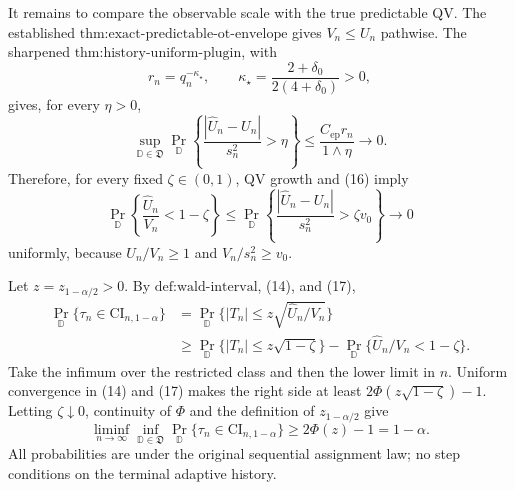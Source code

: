 It remains to compare the observable scale with the true predictable QV. The established \(\text{thm:exact-predictable-ot-envelope}\) gives \(V_n\le U_n\) pathwise. The sharpened \(\text{thm:history-uniform-plugin}\), with
\[
r_n=q_n^{-\kappa_\star},\qquad
\kappa_\star=\frac{2+\delta_0}{2(4+\delta_0)}>0,
\tag{15}
\]
gives, for every \(\eta>0\),
\[
\sup_{\mathbb D\in\mathfrak D}\Pr_{\mathbb D}
\left\{\frac{|\widehat U_n-U_n|}{s_n^2}>\eta\right\}
\le\frac{C_{\mathrm{ep}}r_n}{1\wedge\eta}\longrightarrow0.
\tag{16}
\]
Therefore, for every fixed \(\zeta\in(0,1)\), QV growth and (16) imply
\[
\Pr_{\mathbb D}\left\{\frac{\widehat U_n}{V_n}<1-\zeta\right\}
\le\Pr_{\mathbb D}\left\{\frac{|\widehat U_n-U_n|}{s_n^2}>\zeta v_0\right\}
\longrightarrow0
\tag{17}
\]
uniformly, because \(U_n/V_n\ge1\) and \(V_n/s_n^2\ge v_0\).

Let \(z=z_{1-\alpha/2}>0\). By \(\text{def:wald-interval}\), (14), and (17),
\[
\begin{aligned}
\Pr_{\mathbb D}\{\tau_n\in\mathrm{CI}_{n,1-\alpha}\}
&=\Pr_{\mathbb D}\{|T_n|\le z\sqrt{\widehat U_n/V_n}\}\\
&\ge\Pr_{\mathbb D}\{|T_n|\le z\sqrt{1-\zeta}\}
-\Pr_{\mathbb D}\{\widehat U_n/V_n<1-\zeta\}.
\end{aligned}
\tag{18}
\]
Take the infimum over the restricted class and then the lower limit in \(n\). Uniform convergence in (14) and (17) makes the right side at least
\(2\Phi(z\sqrt{1-\zeta})-1\). Letting \(\zeta\downarrow0\), continuity of \(\Phi\) and the definition of \(z_{1-\alpha/2}\) give
\[
\liminf_{n\to\infty}\inf_{\mathbb D\in\mathfrak D}
\Pr_{\mathbb D}\{\tau_n\in\mathrm{CI}_{n,1-\alpha}\}
\ge2\Phi(z)-1=1-\alpha.
\tag{19}
\]
All probabilities are under the original sequential assignment law; no step conditions on the terminal adaptive history.